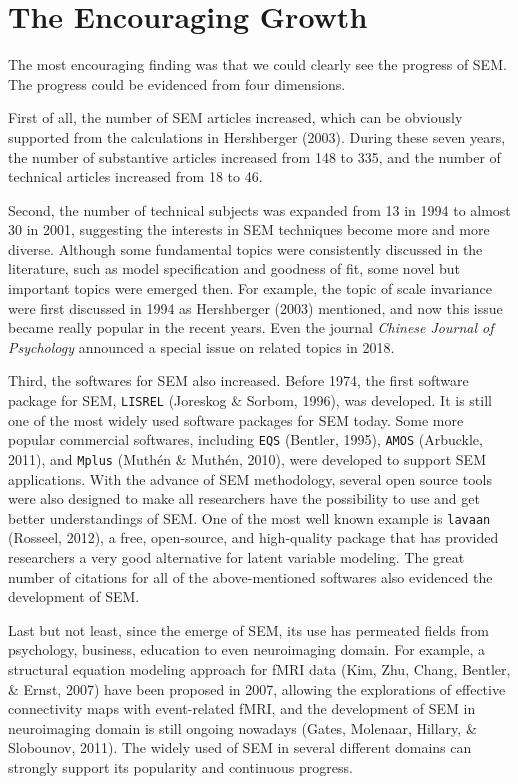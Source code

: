\documentclass[jou]{apa6}
\theoremstyle{definition}
\theoremstyle{definition}
\theoremstyle{definition}
\theoremstyle{remark}
\begin{document}
\hypertarget{the-encouraging-growth}{%
\section{The Encouraging Growth}\label{the-encouraging-growth}}

The most encouraging finding was that we could clearly see the progress
of SEM. The progress could be evidenced from four dimensions.

\setlength{\parindent}{4ex}

First of all, the number of SEM articles increased, which can be
obviously supported from the calculations in Hershberger (2003). During
these seven years, the number of substantive articles increased from 148
to 335, and the number of technical articles increased from 18 to 46.

Second, the number of technical subjects was expanded from 13 in 1994 to
almost 30 in 2001, suggesting the interests in SEM techniques become
more and more diverse. Although some fundamental topics were
consistently discussed in the literature, such as model specification
and goodness of fit, some novel but important topics were emerged then.
For example, the topic of scale invariance were first discussed in 1994
as Hershberger (2003) mentioned, and now this issue became really
popular in the recent years. Even the journal \emph{Chinese Journal of
Psychology} announced a special issue on related topics in 2018.

Third, the softwares for SEM also increased. Before 1974, the first
software package for SEM, \texttt{LISREL} (Joreskog \& Sorbom, 1996),
was developed. It is still one of the most widely used software packages
for SEM today. Some more popular commercial softwares, including
\texttt{EQS} (Bentler, 1995), \texttt{AMOS} (Arbuckle, 2011), and
\texttt{Mplus} (Muthén \& Muthén, 2010), were developed to support SEM
applications. With the advance of SEM methodology, several open source
tools were also designed to make all researchers have the possibility to
use and get better understandings of SEM. One of the most well known
example is \texttt{lavaan} (Rosseel, 2012), a free, open-source, and
high-quality package that has provided researchers a very good
alternative for latent variable modeling. The great number of citations
for all of the above-mentioned softwares also evidenced the development
of SEM.

Last but not least, since the emerge of SEM, its use has permeated
fields from psychology, business, education to even neuroimaging domain.
For example, a structural equation modeling approach for fMRI data (Kim,
Zhu, Chang, Bentler, \& Ernst, 2007) have been proposed in 2007,
allowing the explorations of effective connectivity maps with
event-related fMRI, and the development of SEM in neuroimaging domain is
still ongoing nowadays (Gates, Molenaar, Hillary, \& Slobounov, 2011).
The widely used of SEM in several different domains can strongly support
its popularity and continuous progress.
\end{document}
